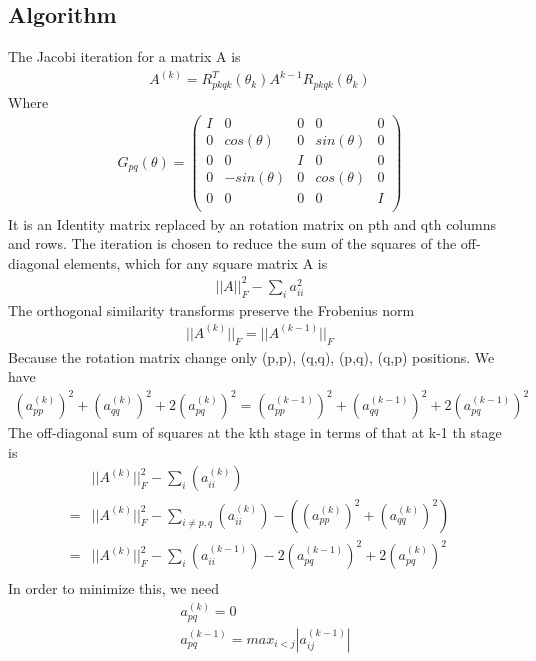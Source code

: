 \documentclass[a4paper]{article}
\begin{document}
\subsection{Algorithm}
The Jacobi iteration for a matrix A is
\begin{align*}
	A^{(k)} = R^T_{pkqk}(\theta_k) A^{k-1} R_{pkqk} (\theta_k)
\end{align*}
Where
\begin{align*}
	G_{pq}(\theta)
	= 
	\left( \begin{array}{ccccc}
I      & 	0 	& 	0 	 & 	 0 		& 	0 	\\
0	   & 	cos(\theta) 	& 	0 	 &	 sin(\theta) 		& 	0	\\
0 	   &    0   &   I  	 &   0		&	0	\\
0 	   &    -sin(\theta)   &   0    &   cos(\theta)		& 	0	\\
0      &    0   &   0    & 	 0   	& 	I	\\\end{array} \right)
\end{align*}
It is an Identity matrix replaced by an rotation matrix on pth and qth columns and rows. The iteration is chosen to reduce the sum of the squares of the off-diagonal elements, which for any square matrix A is
\begin{align*}
	||A||_F^2 - \sum_i a_{ii}^2
\end{align*}
The orthogonal similarity transforms preserve the Frobenius norm
\begin{align*}
	|| A^{(k)}||_F = ||A^{(k-1)}||_F
\end{align*}
Because the rotation matrix change only (p,p), (q,q), (p,q), (q,p) positions. We have
\begin{align*}
	(a_{pp}^{(k)})^2 + (a_{qq}^{(k)})^2+ 2 (a_{pq}^{(k)})^2 = (a_{pp}^{(k-1)})^2 + (a_{qq}^{(k-1)})^2 + 2 (a_{pq}^{(k-1)})^2   
\end{align*}
The off-diagonal sum of squares at the kth stage in terms of that at k-1 th stage is
\begin{align*}
	& || A^{(k)}||^2_F - \sum_i (a_{ii}^{(k)}) \\
	= & || A^{(k)}||^2_F - \sum_{i \neq p,q} (a_{ii}^{(k)}) -( (a_{pp}^{(k)})^2 + (a_{qq}^{(k)})^2 ) \\
	= & || A^{(k)}||^2_F - \sum_i (a_{ii}^{(k-1)}) - 2 (a_{pq}^{(k-1)})^2  + 2 (a_{pq}^{(k)})^2  \\
\end{align*}
In order to minimize this, we need
\begin{align*}
	& a_{pq}^{(k)} = 0\\
	& a_{pq}^{(k-1)} = max _{i<j} |a_{ij} ^ {(k-1)}|\\
\end{align*}
\end{document}
